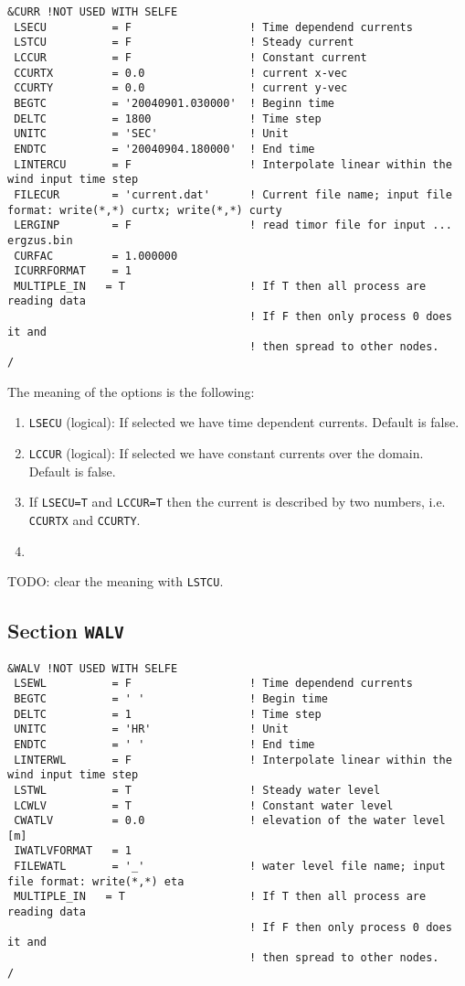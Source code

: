 \documentclass[12pt]{amsart}
\begin{document}
\begin{verbatim}
&CURR !NOT USED WITH SELFE
 LSECU          = F                  ! Time dependend currents
 LSTCU          = F                  ! Steady current
 LCCUR          = F                  ! Constant current
 CCURTX         = 0.0                ! current x-vec
 CCURTY         = 0.0                ! current y-vec
 BEGTC          = '20040901.030000'  ! Beginn time
 DELTC          = 1800               ! Time step
 UNITC          = 'SEC'              ! Unit
 ENDTC          = '20040904.180000'  ! End time
 LINTERCU       = F                  ! Interpolate linear within the wind input time step
 FILECUR        = 'current.dat'      ! Current file name; input file format: write(*,*) curtx; write(*,*) curty
 LERGINP        = F                  ! read timor file for input ... ergzus.bin
 CURFAC         = 1.000000
 ICURRFORMAT    = 1
 MULTIPLE_IN   = T                   ! If T then all process are reading data
                                     ! If F then only process 0 does it and
                                     ! then spread to other nodes.
/
\end{verbatim}
The meaning of the options is the following:
\begin{enumerate}
\item {\tt LSECU} (logical): If selected we have time dependent currents. Default is false.
\item {\tt LCCUR} (logical): If selected we have constant currents over the domain. Default is false.
\item If {\tt LSECU=T} and {\tt LCCUR=T} then the current is described by two numbers, i.e. {\tt CCURTX} and {\tt CCURTY}.
\item 
\end{enumerate}
TODO: clear the meaning with {\tt LSTCU}.


\subsection{Section {\tt WALV}}
\begin{verbatim}
&WALV !NOT USED WITH SELFE
 LSEWL          = F                  ! Time dependend currents
 BEGTC          = ' '                ! Begin time
 DELTC          = 1                  ! Time step
 UNITC          = 'HR'               ! Unit
 ENDTC          = ' '                ! End time
 LINTERWL       = F                  ! Interpolate linear within the wind input time step
 LSTWL          = T                  ! Steady water level
 LCWLV          = T                  ! Constant water level
 CWATLV         = 0.0                ! elevation of the water level [m]
 IWATLVFORMAT   = 1
 FILEWATL       = '_'                ! water level file name; input file format: write(*,*) eta
 MULTIPLE_IN   = T                   ! If T then all process are reading data
                                     ! If F then only process 0 does it and
                                     ! then spread to other nodes.
/
\end{verbatim}
\end{document}
